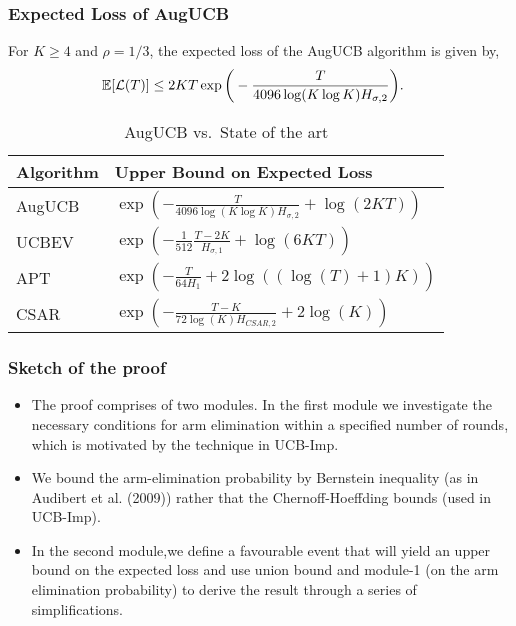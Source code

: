 \begin{frame}
\frametitle{Expected Loss of AugUCB}

\begin{theorem}
For $K\geq 4$ and $\rho={1}/{3}$,
the expected loss of the AugUCB algorithm is given by,
\begin{align*}
\mathbb{E}[\mathcal{L}(T)]
& \leq 2KT \exp\bigg(- \frac{T}{4096 \log( K\log K) H_{\sigma,2}} \bigg).
\end{align*}
\end{theorem}


\begin{table}[b]
\caption{AugUCB vs.\ State of the art}
\label{tab:regret-bds}
\begin{center}
\begin{tabular}{|p{1.5cm}|p{6.4cm}|}
\hline
Algorithm  & Upper Bound on Expected Loss \\
\hline
AugUCB      &$ \exp\left(- \frac{T}{4096 \log(K\log K)H_{\sigma,2}} + \log\left(2KT\right) \right) $ \\
\hline
UCBEV		&$\exp\left(-\frac{1}{512}\frac{T-2K}{H_{\sigma,1}} + \log\left(6KT\right)\right)$ \\
\hline
APT         &$\exp\left(-\frac{T}{64 H_1}+2\log((\log(T)+1)K)\right)$ \\
\hline
CSAR		&$\exp\left(-\frac{T-K}{72\log(K)H_{CSAR,2}}+2\log(K)\right)$ \\
\hline

\end{tabular}
\end{center}
\end{table}
\end{frame}



\begin{frame}
\frametitle{Sketch of the proof}
\begin{itemize}
\item<1-> The proof comprises of two modules. In the first module we investigate the necessary conditions for arm elimination within a specified number of rounds, which is motivated by the technique in UCB-Imp. 
 
\item<2-> We bound the arm-elimination probability by Bernstein inequality (as in {Audibert et al. (2009)}) rather that the Chernoff-Hoeffding bounds (used in UCB-Imp). 

\item<3-> In the second module,we define a favourable event that will yield an upper bound on the expected loss and use union bound and module-1 (on the arm elimination probability) to derive the result through a series of simplifications.
\end{itemize}

\end{frame}



